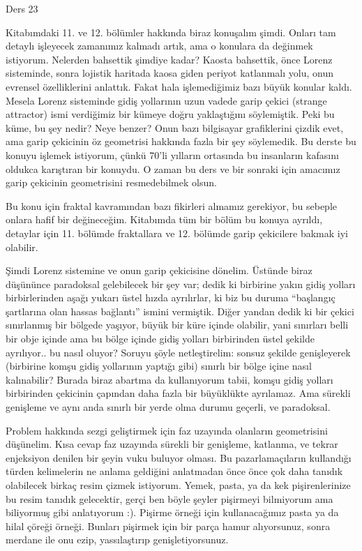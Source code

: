 \documentclass[12pt,fleqn]{article}\usepackage{../../common}
\begin{document}
Ders 23

Kitabımdaki 11. ve 12. bölümler hakkında biraz konuşalım şimdi. Onları tam
detaylı işleyecek zamanımız kalmadı artık, ama o konulara da değinmek
istiyorum. Nelerden bahsettik şimdiye kadar? Kaosta bahsettik, önce Lorenz
sisteminde, sonra lojistik haritada kaosa giden periyot katlanmalı yolu, onun
evrensel özelliklerini anlattık. Fakat hala işlemediğimiz bazı büyük konular
kaldı. Mesela Lorenz sisteminde gidiş yollarının uzun vadede garip çekici
(strange attractor) ismi verdiğimiz bir kümeye doğru yaklaştığını
söylemiştik. Peki bu küme, bu şey nedir? Neye benzer? Onun bazı bilgisayar
grafiklerini çizdik evet, ama garip çekicinin öz geometrisi hakkında fazla bir
şey söylemedik. Bu derste bu konuyu işlemek istiyorum, çünkü 70'li yılların
ortasında bu insanların kafasını oldukca karıştıran bir konuydu. O zaman bu ders
ve bir sonraki için amacımız garip çekicinin geometrisini resmedebilmek olsun.

Bu konu için fraktal kavramından bazı fikirleri almamız gerekiyor, bu sebeple
onlara hafif bir değineceğim. Kitabımda tüm bir bölüm bu konuya ayrıldı,
detaylar için 11. bölümde fraktallara ve 12. bölümde garip çekicilere bakmak iyi
olabilir.

Şimdi Lorenz sistemine ve onun garip çekicisine dönelim. Üstünde biraz düşününce
paradoksal gelebilecek bir şey var; dedik ki birbirine yakın gidiş yolları
birbirlerinden aşağı yukarı üstel hızda ayrılırlar, ki biz bu duruma ``başlangıç
şartlarına olan hassas bağlantı'' ismini vermiştik. Diğer yandan dedik ki bir
çekici sınırlanmış bir bölgede yaşıyor, büyük bir küre içinde olabilir, yani
sınırları belli bir obje içinde ama bu bölge içinde gidiş yolları birbirinden
üstel şekilde ayrılıyor.. bu nasıl oluyor? Soruyu şöyle netleştirelim: sonsuz
şekilde genişleyerek (birbirine komşu gidiş yollarının yaptığı gibi) sınırlı bir
bölge içine nasıl kalınabilir? Burada biraz abartma da kullanıyorum tabii, komşu
gidiş yolları birbirinden çekicinin çapından daha fazla bir büyüklükte
ayrılamaz. Ama sürekli genişleme ve aynı anda sınırlı bir yerde olma durumu
geçerli, ve paradoksal.

Problem hakkında sezgi geliştirmek için faz uzayında olanların geometrisini
düşünelim. Kısa cevap faz uzayında sürekli bir genişleme, katlanma, ve tekrar
enjeksiyon denilen bir şeyin vuku buluyor olması. Bu pazarlamaçıların kullandığı
türden kelimelerin ne anlama geldiğini anlatmadan önce önce çok daha tanıdık
olabilecek birkaç resim çizmek istiyorum. Yemek, pasta, ya da kek
pişirenlerinize bu resim tanıdık gelecektir, gerçi ben böyle şeyler pişirmeyi
bilmiyorum ama biliyormuş gibi anlatıyorum :). Pişirme örneği için
kullanacağımız pasta ya da hilal çöreği örneği. Bunları pişirmek için bir parça
hamur alıyorsunuz, sonra merdane ile onu ezip, yassılaştırıp genişletiyorsunuz.
\end{document}

